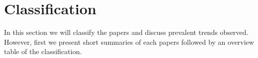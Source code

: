 \section{Classification}%
\label{sec}
In this section we will classify the papers and discuss prevalent trends observed.
However, first we present short summaries of each papers followed by an overview table of the classification.
